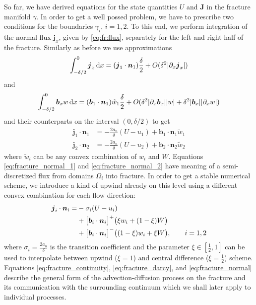 \documentclass[a4paper]{article}
\def\prtl{\partial}
\def\vc#1{\mathbf{\boldsymbol{#1}}}     %
\def\abs#1{\lvert#1\rvert}
\def\d {\,{\rm d}}
\begin{document}
So far, we have derived equations for the state quantities $U$ and $\vc J$ in the fracture manifold $\gamma$. In order to
get a well possed problem, we have to prescribe two conditions for the boundaries $\gamma_i$, $i=1,2$. To this end, we
perform integration of the normal flux $\vc j_x$, given by \eqref{eq:fr:flux}, separately for the left and right half of the fracture.
Similarly as before we use approximations
\[
 \int_{-\delta/2}^0 \vc j_x \d x = (\vc j_1 \cdot \vc n_1)\frac{\delta}{2} + O(\delta^2 \abs{\prtl_x \vc j_x})
\]
and 
\[
 \int_{-\delta/2}^0 \vc b_x w \d x = (\vc b_1 \cdot \vc n_1)\tilde{w}_1\frac{\delta}{2} + O(\delta^2 \abs{\prtl_x \vc b_x}\abs{w} + \delta^2\abs{\vc b_x}\abs{\prtl_x w})
\]
and their counterparts on the interval $(0,\delta/2)$ to get
\begin{align}
    \label{eq:fracture_normal_1}
     \vc j_1 \cdot \vc n_1 &= -\frac{2a_n}{\delta} (U - u_1) + \vc b_1\cdot \vc n_1 \tilde{w}_1\\
    \label{eq:fracture_normal_2}
    \vc j_2 \cdot \vc n_2 &= -\frac{2a_n}{\delta} (U - u_2) + \vc b_2\cdot \vc n_2 \tilde{w}_2
\end{align}
where $\tilde w_i$ can be any convex combination of $w_i$ and $W$. Equations \eqref{eq:fracture_normal_1}  
and \eqref{eq:fracture_normal_2} have meaning of a semi-discretized flux from domains $\Omega_i$ into fracture.
In order to get a stable numerical scheme, we introduce a kind of upwind already on this level using a different convex 
combination for each flow direction:
\begin{align}
   \notag 
   \vc j_i \cdot \vc n_i
       = &-\sigma_i (U - u_i)      \\ 
   \notag
      &+ \big[\vc b_i\cdot \vc n_i\big]^{+} \big(\xi w_i + (1-\xi) W\big)       \\
      \label{eq:fracture_normal}
      &+ \big[\vc b_i\cdot \vc n_i\big]^{-} \big((1-\xi) w_i + \xi W\big), \qquad i=1,2
\end{align}
where $\sigma_i = \frac{2a_n}{\delta}$ is the transition coefficient and the parameter $\xi\in [\frac12, 1]$ can be used to interpolate
between upwind ($\xi = 1$) and central difference ($\xi=\frac12$) scheme. Equations \eqref{eq:fracture_continuity}, \eqref{eq:fracture_darcy}, and
\eqref{eq:fracture_normal} describe the general form of the advection-diffusion process on the fracture and its communication with 
the surrounding continuum which we shall later apply to individual processes.
\end{document}
